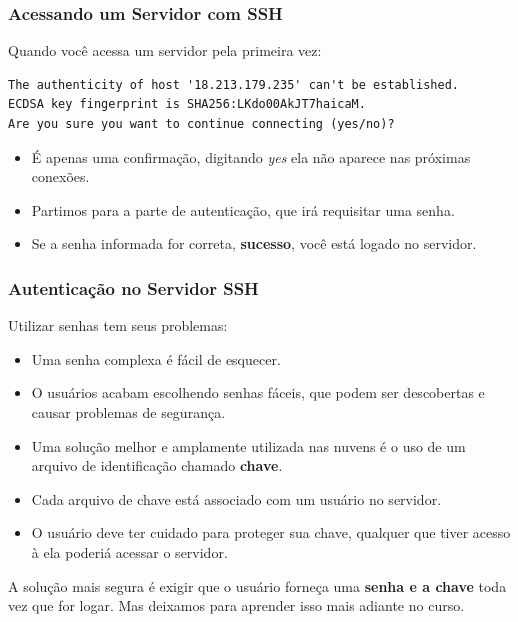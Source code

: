 \documentclass{beamer}
\begin{document}
\begin{frame}[fragile]
   \frametitle{Acessando um Servidor com SSH}
   Quando você acessa um servidor pela primeira vez:
   \small
   \begin{verbatim}
The authenticity of host '18.213.179.235' can't be established.
ECDSA key fingerprint is SHA256:LKdo00AkJT7haicaM.
Are you sure you want to continue connecting (yes/no)?    
   \end{verbatim}
   \normalsize
   \begin{itemize}
      \item É apenas uma confirmação, digitando \textit{yes} ela não aparece nas próximas conexões.
      \item Partimos para a parte de autenticação, que irá requisitar uma senha.
      \item Se a senha informada for correta, \textbf{sucesso}, você está logado no servidor.
   \end{itemize}
\end{frame}

\begin{frame}
   \frametitle{Autenticação no Servidor SSH}
   Utilizar senhas tem seus problemas:
   \begin{itemize}
      \item Uma senha complexa é fácil de esquecer.
      \item O usuários acabam escolhendo senhas fáceis, que podem ser descobertas e causar problemas de segurança.
      \item Uma solução melhor e amplamente utilizada nas nuvens é o uso de um arquivo de identificação chamado \textbf{chave}.
      \item Cada arquivo de chave está associado com um usuário no servidor.
      \item O usuário deve ter cuidado para proteger sua chave, qualquer que tiver acesso à ela poderiá acessar o servidor.
   \end{itemize}
   A solução mais segura é exigir que o usuário forneça uma \textbf{senha e a chave} toda vez que for logar. Mas deixamos para aprender isso mais adiante no curso.
\end{frame}
\end{document}
